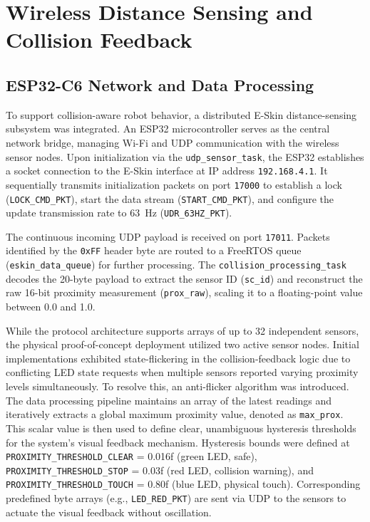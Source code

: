 \section{Wireless Distance Sensing and Collision Feedback}


\subsection{ESP32-C6 Network and Data Processing}
To support collision-aware robot behavior, a distributed E-Skin distance-sensing subsystem was integrated. An ESP32 microcontroller serves as the central network bridge, managing Wi-Fi and UDP communication with the wireless sensor nodes. Upon initialization via the \texttt{udp\_sensor\_task}, the ESP32 establishes a socket connection to the E-Skin interface at IP address \texttt{192.168.4.1}. It sequentially transmits initialization packets on port \texttt{17000} to establish a lock (\texttt{LOCK\_CMD\_PKT}), start the data stream (\texttt{START\_CMD\_PKT}), and configure the update transmission rate to 63~Hz (\texttt{UDR\_63HZ\_PKT}).

The continuous incoming UDP payload is received on port \texttt{17011}. Packets identified by the \texttt{0xFF} header byte are routed to a FreeRTOS queue (\texttt{eskin\_data\_queue}) for further processing. The \texttt{collision\_processing\_task} decodes the 20-byte payload to extract the sensor ID (\texttt{sc\_id}) and reconstruct the raw 16-bit proximity measurement (\texttt{prox\_raw}), scaling it to a floating-point value between 0.0 and 1.0.

While the protocol architecture supports arrays of up to 32 independent sensors, the physical proof-of-concept deployment utilized two active sensor nodes. Initial implementations exhibited state-flickering in the collision-feedback logic due to conflicting LED state requests when multiple sensors reported varying proximity levels simultaneously. To resolve this, an anti-flicker algorithm was introduced. The data processing pipeline maintains an array of the latest readings and iteratively extracts a global maximum proximity value, denoted as \texttt{max\_prox}. This scalar value is then used to define clear, unambiguous hysteresis thresholds for the system's visual feedback mechanism. Hysteresis bounds were defined at \texttt{PROXIMITY\_\allowbreak THRESHOLD\_\allowbreak CLEAR} = 0.016f (green LED, safe), \texttt{PROXIMITY\_\allowbreak THRESHOLD\_\allowbreak STOP} = 0.03f (red LED, collision warning), and \texttt{PROXIMITY\_\allowbreak THRESHOLD\_\allowbreak TOUCH} = 0.80f (blue LED, physical touch). Corresponding predefined byte arrays (e.g., \texttt{LED\_\allowbreak RED\_\allowbreak PKT}) are sent via UDP to the sensors to actuate the visual feedback without oscillation.


